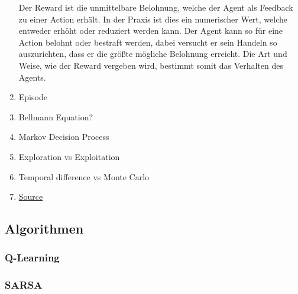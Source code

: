 \begin{enumerate}
    Der Reward ist die unmittelbare Belohnung, welche der Agent als Feedback zu einer Action erhält. In der Praxis ist dies ein numerischer Wert, welche entweder erhöht oder reduziert werden kann. Der Agent kann so für eine Action belohnt oder bestraft werden, dabei versucht er sein Handeln so auszurichten, dass er die größte mögliche Belohnung erreicht. Die Art und Weise, wie der Reward vergeben wird, bestimmt somit das Verhalten des Agents.
    \item Episode
    \item Bellmann Equation?
    \item Markov Decision Process
    \item Exploration vs Exploitation
    \item Temporal difference vs Monte Carlo
    \item \href{https://blog.floydhub.com/an-introduction-to-q-learning-reinforcement-learning/}{Source} 
\end{enumerate}

\subsection{Algorithmen}

\subsubsection{Q-Learning}

\subsubsection{SARSA}

